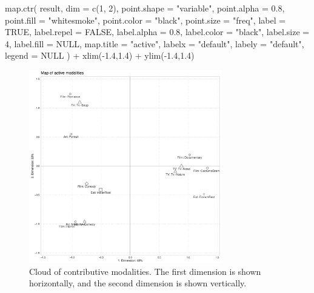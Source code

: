 \documentclass[
  letterpaper,
  DIV=11,
  numbers=noendperiod]{scrartcl}
\newenvironment{Shaded}{\begin{snugshade}}{\end{snugshade}}
\newcommand{\AttributeTok}[1]{\textcolor[rgb]{0.40,0.45,0.13}{#1}}
\newcommand{\ConstantTok}[1]{\textcolor[rgb]{0.56,0.35,0.01}{#1}}
\newcommand{\DecValTok}[1]{\textcolor[rgb]{0.68,0.00,0.00}{#1}}
\newcommand{\FloatTok}[1]{\textcolor[rgb]{0.68,0.00,0.00}{#1}}
\newcommand{\FunctionTok}[1]{\textcolor[rgb]{0.28,0.35,0.67}{#1}}
\newcommand{\NormalTok}[1]{\textcolor[rgb]{0.00,0.23,0.31}{#1}}
\newcommand{\SpecialCharTok}[1]{\textcolor[rgb]{0.37,0.37,0.37}{#1}}
\newcommand{\StringTok}[1]{\textcolor[rgb]{0.13,0.47,0.30}{#1}}
\begin{document}
\begin{Shaded}
\begin{Highlighting}[]
\FunctionTok{map.ctr}\NormalTok{(}
\NormalTok{  result,}
  \AttributeTok{dim =} \FunctionTok{c}\NormalTok{(}\DecValTok{1}\NormalTok{, }\DecValTok{2}\NormalTok{),}
  \AttributeTok{point.shape =} \StringTok{"variable"}\NormalTok{,}
  \AttributeTok{point.alpha =} \FloatTok{0.8}\NormalTok{,}
  \AttributeTok{point.fill =} \StringTok{"whitesmoke"}\NormalTok{,}
  \AttributeTok{point.color =} \StringTok{"black"}\NormalTok{,}
  \AttributeTok{point.size =} \StringTok{"freq"}\NormalTok{,}
  \AttributeTok{label =} \ConstantTok{TRUE}\NormalTok{,}
  \AttributeTok{label.repel =} \ConstantTok{FALSE}\NormalTok{,}
  \AttributeTok{label.alpha =} \FloatTok{0.8}\NormalTok{,}
  \AttributeTok{label.color =} \StringTok{"black"}\NormalTok{,}
  \AttributeTok{label.size =} \DecValTok{4}\NormalTok{,}
  \AttributeTok{label.fill =} \ConstantTok{NULL}\NormalTok{,}
  \AttributeTok{map.title =} \StringTok{"active"}\NormalTok{,}
  \AttributeTok{labelx =} \StringTok{"default"}\NormalTok{,}
  \AttributeTok{labely =} \StringTok{"default"}\NormalTok{,}
  \AttributeTok{legend =} \ConstantTok{NULL}
\NormalTok{) }\SpecialCharTok{+} \FunctionTok{xlim}\NormalTok{(}\SpecialCharTok{{-}}\FloatTok{1.4}\NormalTok{,}\FloatTok{1.4}\NormalTok{) }\SpecialCharTok{+} \FunctionTok{ylim}\NormalTok{(}\SpecialCharTok{{-}}\FloatTok{1.4}\NormalTok{,}\FloatTok{1.4}\NormalTok{)}
\end{Highlighting}
\end{Shaded}

\begin{figure}[H]

{\centering \includegraphics[width=0.75\textwidth,height=\textheight]{ctrl+R_files/figure-pdf/unnamed-chunk-10-1.pdf}

}

\caption{Cloud of contributive modalities. The first dimension is shown
horizontally, and the second dimension is shown vertically.}

\end{figure}%
\end{document}
